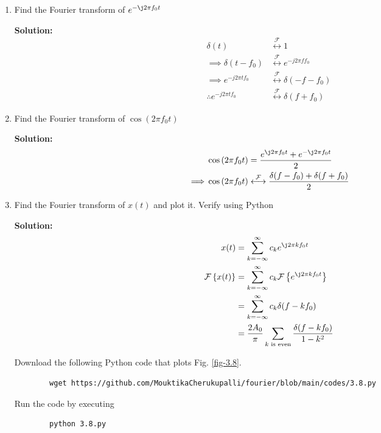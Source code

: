 \documentclass[journal,12pt,twocolumn]{IEEEtran}
\newcommand{\solution}{\noindent \textbf{Solution: }}
\providecommand{\brak}[1]{\ensuremath{\left(#1\right)}}
\providecommand{\cbrak}[1]{\ensuremath{\left\{#1\right\}}}
\providecommand{\der}[1]{\mathrm{d} #1}
\providecommand{\system}[1]{\overset{\mathcal{#1}}{ \longleftrightarrow}}
\numberwithin{equation}{section}
\numberwithin{figure}{section}
\renewcommand\thesection{\arabic{section}}
\begin{document}
\begin{enumerate}[label=\thesection.\arabic*,ref=\thesection.\theenumi]
	\solution 
	\begin{align}
		\delta(t)\system{F} &\int_{-\infty}^{\infty}\delta(t)e^{-j2\pi ft}\,\der{t} \\
		=& \left. e^{-j2\pi ft} \right|_{t=0} \\
		=& 1
	\end{align}
	
	\item Find the Fourier transform of $e^{-\j2\pi f_0 t}$
	
	\solution 
	\begin{align}
		\delta(t) &\system{F} 1 \\
		\implies \delta(t-f_0) &\system{F} e^{-j2\pi ff_0} \\
		\implies e^{-j2\pi tf_0} &\system{F} \delta(-f-f_0) \\
		\therefore e^{-j2\pi tf_0} &\system{F} \delta(f+f_0)
	\end{align}
	
	\item Find the Fourier transform of $\cos\brak{2\pi f_0 t}$
	
	\solution 
	\begin{align}
		&\cos\brak{2\pi f_0 t} = \frac{e^{\j2\pi f_0 t} + e^{-\j2\pi f_0 t}}{2} \\
		\implies &\cos\brak{2\pi f_0 t} \system{F} \frac{\delta(f-f_0) + \delta(f+f_0)}{2}
	\end{align}

	\item Find the Fourier transform of $x(t)$ and plot it. Verify using Python

	\solution 
	\begin{align}
		x(t) &= \sum_{k=-\infty}^\infty c_k e^{\j 2\pi kf_0t} \\
		\mathcal{F}\cbrak{x(t)} &= \sum_{k=-\infty}^\infty c_k \mathcal{F}\cbrak{e^{\j 2\pi kf_0t}} \\
		&= \sum_{k=-\infty}^\infty c_k \delta(f-kf_0) \\
		&= \frac{2A_0}{\pi} \sum_{k \text{ is even}} \frac{\delta(f-kf_0)}{1-k^2}
	\end{align}
	
	Download the following Python code that plots Fig. \ref{fig-3.8}.
	\begin{lstlisting}
		wget https://github.com/MouktikaCherukupalli/fourier/blob/main/codes/3.8.py
	\end{lstlisting}
	
	Run the code by executing
	\begin{lstlisting}
		python 3.8.py
	\end{lstlisting}


\end{enumerate}
\end{document}
